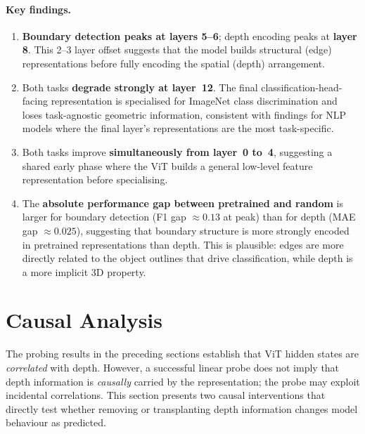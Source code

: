 \documentclass[11pt,a4paper]{article}
\begin{document}
\paragraph{Key findings.}
\begin{enumerate}
    \item \textbf{Boundary detection peaks at layers 5--6}; depth encoding
          peaks at \textbf{layer 8}.  This 2--3 layer offset suggests that
          the model builds structural (edge) representations before fully
          encoding the spatial (depth) arrangement.

    \item Both tasks \textbf{degrade strongly at layer~12}.  The final
          classification-head-facing representation is specialised for
          ImageNet class discrimination and loses task-agnostic geometric
          information, consistent with findings for NLP models where the final
          layer's representations are the most task-specific.

    \item Both tasks improve \textbf{simultaneously from layer~0 to~4},
          suggesting a shared early phase where the ViT builds a general
          low-level feature representation before specialising.

    \item The \textbf{absolute performance gap between pretrained and random}
          is larger for boundary detection (F1 gap $\approx\!0.13$ at peak)
          than for depth (MAE gap $\approx\!0.025$), suggesting that boundary
          structure is more strongly encoded in pretrained representations
          than depth.  This is plausible: edges are more directly related to
          the object outlines that drive classification, while depth is a
          more implicit 3D property.
\end{enumerate}

\section{Causal Analysis}
\label{sec:causal}

The probing results in the preceding sections establish that ViT hidden states
are \emph{correlated} with depth.  However, a successful linear probe does not
imply that depth information is \emph{causally} carried by the representation;
the probe may exploit incidental correlations.  This section presents two
causal interventions that directly test whether removing or transplanting depth
information changes model behaviour as predicted.
\end{document}
